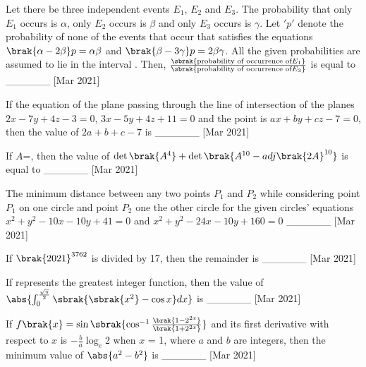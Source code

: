 \iffalse
\title{2021}
\author{AI24BTECH11009}
\section{integer}
\fi
\item  Let there be three independent events $E_1$, $E_2$ and $E_3$. The probability that only $E_1$ occurs is $\alpha$, only $E_2$ occurs is $\beta$ and only $E_3$ occurs is $\gamma$. Let $'p'$ denote the probability of none of the events that occur that satisfies the equations $\brak{\alpha - 2\beta}p = \alpha\beta$ and $\brak{\beta - 3\gamma}p = 2\beta\gamma$. All the given probabilities are assumed to lie in the interval . Then, $\frac{\sbrak{\text{probability of occurrence of} E_1}}{\sbrak{\text{probability of occurrence of} E_3}}$ is equal to \_\_\_\_\_\_  \hfill[Mar 2021] \\
\item If the equation of the plane passing through the line of intersection of the planes $2x - 7y + 4z - 3 = 0$, $3x - 5y + 4z + 11 = 0$ and the point  is $ax + by + cz - 7 = 0$, then the value of $2a + b + c - 7$ is \_\_\_\_\_\_ \hfill[Mar 2021] \\
\item If $A$=, then the value of $\det{\brak{A^4}} + \det{\brak{A^{10} - adj\brak{2A}^{10}}}$ is equal to \_\_\_\_\_\_ \hfill[Mar 2021] \\
\item The minimum distance between any two points $P_1$ and $P_2$ while considering point $P_1$ on one circle and point $P_2$ one the other circle for the given circles' equations $x^2 + y^2 - 10x - 10y + 41 = 0$ and $x^2 + y^2 - 24x - 10y + 160 = 0$ \_\_\_\_\_\_ \hfill[Mar 2021] \\
\item If $\brak{2021}^{3762}$ is divided by 17, then the remainder is \_\_\_\_\_\_ \hfill[Mar 2021] \\
\item If \sbrak{\cdot} represents the greatest integer function, then the value of $\abs{\int_{0}^{\frac{\sqrt\pi}{2}}\sbrak{\sbrak{x^2} - \cos{x}}dx}$ is \_\_\_\_\_\_ \hfill[Mar 2021] \\
\item If $f\brak{x} = \sin\sbrak{\cos^{-1}\frac{\brak{1-2^{2x}}}{\brak{1+2^{2x}}}}$ and its first derivative with respect to $x$ is $-\frac{b}{a}\log_{e}{2}$ when $x$ = 1, where $a$ and $b$ are integers, then the minimum value of $\abs{a^2 - b^2}$ is \_\_\_\_\_\_ \hfill[Mar 2021] \\
